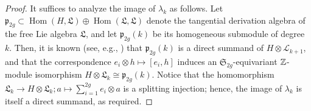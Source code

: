 \documentclass{article}
\theoremstyle{plain}
\theoremstyle{definition}
\def\Qer{\mathop{\mathrm{Ker}}\nolimits}
\def\Coker{\mathop{\mathrm{Coker}}\nolimits}
\def\Hom{\mathop{\mathrm{Hom}}\nolimits}
\newcommand{\ra}{\rightarrow}
\newcommand{\Q}{{\Bbb Q}}
\newcommand{\Z}{{\Bbb Z}}
\begin{document}
{\begin{proof}
It suffices to analyze the image of $\lambda_k$ as follows.
Let $\mathfrak{p}_{2g} \subset \Hom(H, \mathfrak{L}) \oplus \Hom(\mathfrak{L}, \mathfrak{L})$ denote the tangential derivation algebra of the free Lie algebra $\mathfrak{L}$, and let $\mathfrak{p}_{2g}(k)$ be its homogeneous submodule of degree $k$.
Then, it is known (see, e.g., \cite[\S 3]{Satoh3}) that $\mathfrak{p}_{2g}(k)$ is a direct summand of $H \otimes \mathcal{L}_{k+1}$,
and that the correspondence $e_i \otimes h \mapsto [e_i, h]$ induces an $\mathfrak{S}_{2g}$-equivariant $\Z$-module isomorphism $H \otimes \mathfrak{L}_{k}  \cong \mathfrak{p}_{2g}(k)$.
Notice that the homomorphism $ \mathfrak{L}_{k} \ra H \otimes \mathfrak{L}_{k}; a \mapsto \sum_{i=1}^{2g }e_i \otimes a$ is a splitting injection; hence, the image of $\lambda_k$ is itself a direct summand, as required.
\end{proof}

}
\end{document}
